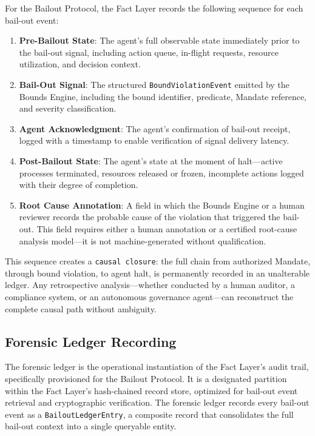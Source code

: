 For the Bailout Protocol, the Fact Layer records the following sequence for each bail-out event:

\begin{enumerate}
  \item \textbf{Pre-Bailout State}: The agent's full observable state immediately prior to the bail-out signal, including action queue, in-flight requests, resource utilization, and decision context.
  \item \textbf{Bail-Out Signal}: The structured \texttt{BoundViolationEvent} emitted by the Bounds Engine, including the bound identifier, predicate, Mandate reference, and severity classification.
  \item \textbf{Agent Acknowledgment}: The agent's confirmation of bail-out receipt, logged with a timestamp to enable verification of signal delivery latency.
  \item \textbf{Post-Bailout State}: The agent's state at the moment of halt—active processes terminated, resources released or frozen, incomplete actions logged with their degree of completion.
  \item \textbf{Root Cause Annotation}: A field in which the Bounds Engine or a human reviewer records the probable cause of the violation that triggered the bail-out. This field requires either a human annotation or a certified root-cause analysis model—it is not machine-generated without qualification.
\end{enumerate}

This sequence creates a \texttt{causal closure}: the full chain from authorized Mandate, through bound violation, to agent halt, is permanently recorded in an unalterable ledger. Any retrospective analysis—whether conducted by a human auditor, a compliance system, or an autonomous governance agent—can reconstruct the complete causal path without ambiguity.

\subsection{Forensic Ledger Recording}
\label{subsection:bailout-forensic-ledger}

The forensic ledger is the operational instantiation of the Fact Layer's audit trail, specifically provisioned for the Bailout Protocol. It is a designated partition within the Fact Layer's hash-chained record store, optimized for bail-out event retrieval and cryptographic verification. The forensic ledger records every bail-out event as a \texttt{BailoutLedgerEntry}, a composite record that consolidates the full bail-out context into a single queryable entity.

